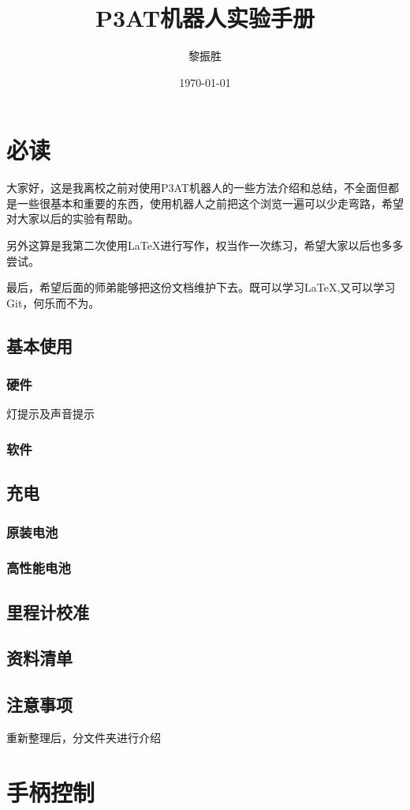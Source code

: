 \documentclass[a4paper,twoside,cs4size,fancyhdr,notitlepage]{ctexart}
\title{P3AT机器人实验手册}
\author{黎振胜}
\date{\today}
\begin{document}
\maketitle{}

\section{必读}
    大家好，这是我离校之前对使用P3AT机器人的一些方法介绍和总结，不全面但都是一些很基本和重要的东西，使用机器人之前把这个浏览一遍可以少走弯路，希望对大家以后的实验有帮助。

    另外这算是我第二次使用\LaTeX 进行写作，权当作一次练习，希望大家以后也多多尝试。

    最后，希望后面的师弟能够把这份文档维护下去。既可以学习\LaTeX ,又可以学习Git，何乐而不为。
\subsection{基本使用}
\subsubsection{硬件}
灯提示及声音提示
\subsubsection{软件}
\subsection{充电}
\subsubsection{原装电池}
\subsubsection{高性能电池}
\subsection{里程计校准}
\subsection{资料清单}
\subsection{注意事项}
重新整理后，分文件夹进行介绍
\section{手柄控制}
\end{document}
